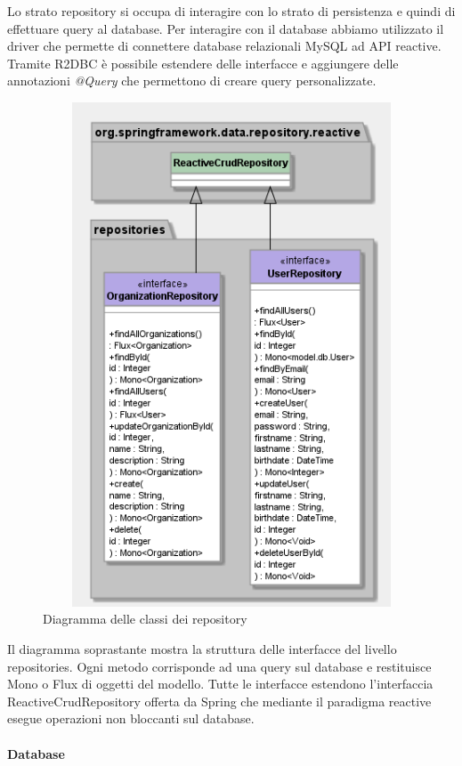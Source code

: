 \documentclass[../manuale-sviluppatore.tex]{subfiles}
\begin{document}
Lo strato repository si occupa di interagire con lo strato di persistenza e quindi di effettuare query al database.
Per interagire con il database abbiamo utilizzato il driver  che permette di connettere database relazionali MySQL ad API reactive.
Tramite R2DBC è possibile estendere delle interfacce e aggiungere delle annotazioni \textit{@Query} che permettono di creare query personalizzate.

\begin{figure}[H]
  \centering
  \includegraphics[width=12cm, height=15cm]{img/server-repositories-diagram.png}
  \caption{Diagramma delle classi dei repository}%
   \label{fig:diagramma delle classi dei repository}
\end{figure}

Il diagramma soprastante mostra la struttura delle interfacce del livello repositories.
Ogni metodo corrisponde ad una query sul database e restituisce Mono o Flux di oggetti del modello.
Tutte le interfacce estendono l'interfaccia ReactiveCrudRepository offerta da Spring che mediante il paradigma reactive esegue operazioni non bloccanti sul database.

\paragraph{Database}%
\label{par:database}
\end{document}
